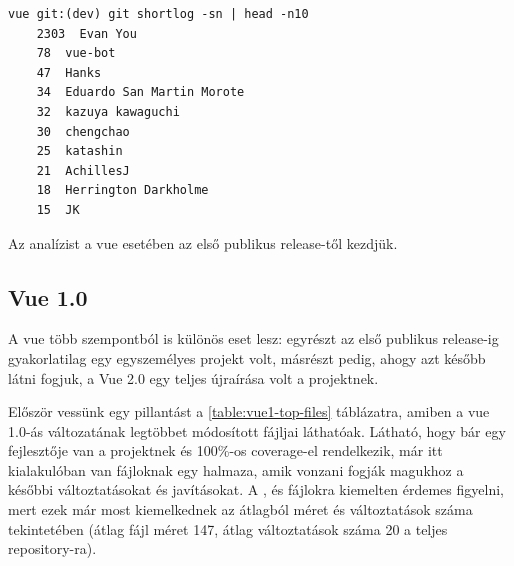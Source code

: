 \begin{lstlisting}
vue git:(dev) git shortlog -sn | head -n10
    2303  Evan You
    78  vue-bot
    47  Hanks
    34  Eduardo San Martin Morote
    32  kazuya kawaguchi
    30  chengchao
    25  katashin
    21  AchillesJ
    18  Herrington Darkholme
    15  JK
\end{lstlisting}\label{code:vue-authors}

Az analízist a vue esetében az első publikus release-től kezdjük.

\subsection{Vue 1.0}

A vue több szempontból is különös eset lesz: egyrészt az első publikus release-ig gyakorlatilag egy egyszemélyes projekt volt, másrészt pedig, ahogy azt később látni fogjuk, a Vue 2.0 egy teljes újraírása volt a projektnek.

Először vessünk egy pillantást a \ref{table:vue1-top-files} táblázatra, amiben a vue 1.0-ás változatának legtöbbet módosított fájljai láthatóak. Látható, hogy bár egy fejlesztője van a projektnek és 100\%-os coverage-el rendelkezik, már itt kialakulóban van fájloknak egy halmaza, amik vonzani fogják magukhoz a későbbi változtatásokat és javításokat. A ,  és  fájlokra kiemelten érdemes figyelni, mert ezek már most kiemelkednek az átlagból méret és változtatások száma tekintetében (átlag fájl méret 147, átlag változtatások száma 20 a teljes repository-ra).

